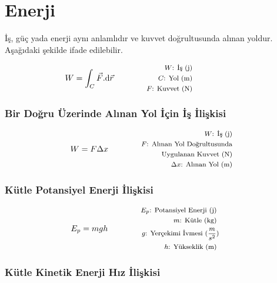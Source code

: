 \section{Enerji}

İş, güç yada enerji aynı anlamlıdır ve kuvvet doğrultusunda alınan yoldur. Aşağıdaki şekilde ifade edilebilir.

\begin{equation}
    W = \int_{C} \vec{F}\text{.d}\vec{r} \qquad \qquad \parbox{4cm}{\footnotesize$\begin{aligned}
        W\text{: İş (j)} \\
        C\text{: Yol (m)} \\
        F\text{: Kuvvet (N)}
\end{aligned}$}
\end{equation}

\subsubsection*{Bir Doğru Üzerinde Alınan Yol İçin İş İlişkisi}
\begin{equation}
    W = F \Delta x  \qquad \qquad \parbox{4cm}{\footnotesize$\begin{aligned}
        W\text{: İş (j)} \\
        F\text{: Alınan Yol Doğrultusunda} \\ \text{Uygulanan Kuvvet (N)} \\
        \Delta x\text{: Alınan Yol (m)}
\end{aligned}$}
\end{equation}

\subsubsection*{Kütle Potansiyel Enerji İlişkisi}

\begin{equation}
    E_p = mgh \qquad \qquad \parbox{4cm}{\footnotesize$\begin{aligned}
        E_p\text{: Potansiyel Enerji (j) } \\
        m\text{: Kütle (kg) } \\
        g\text{: Yerçekimi İvmesi } (\frac{m}{s^2}) \\
        h\text{: Yükseklik (m) }
    \end{aligned}$}
\end{equation}

\subsubsection*{Kütle Kinetik Enerji Hız İlişkisi}

